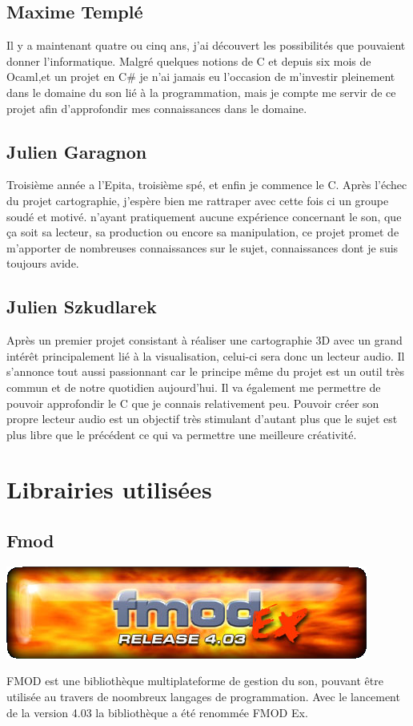 \documentclass[12pt,a4paper]{report}
\begin{document}
	\subsection{Maxime Templé}
Il y a maintenant quatre ou cinq ans, j'ai découvert les possibilités que pouvaient donner l'informatique. Malgré quelques notions de C et depuis six mois de Ocaml,et un projet en C\# je n'ai jamais eu l'occasion de m'investir pleinement dans le domaine du son lié à la programmation, mais je compte me servir de ce projet afin d'approfondir mes connaissances dans le domaine.

	\subsection{Julien Garagnon}
Troisième année a l'Epita, troisième spé, et enfin je commence le C. Après l'échec du projet cartographie, j'espère bien me rattraper avec cette fois ci un groupe soudé et motivé. n'ayant pratiquement aucune expérience concernant le son, que ça soit sa lecteur, sa production ou encore sa manipulation, ce projet promet de m'apporter de nombreuses connaissances sur le sujet, connaissances dont je suis toujours avide.

	\subsection{Julien Szkudlarek}
Après un premier projet consistant à réaliser une cartographie 3D avec un grand intérêt principalement lié à la visualisation, celui-ci sera donc un lecteur audio. Il s'annonce tout aussi passionnant car le principe même du projet est un outil très commun et de notre quotidien aujourd'hui. Il va également me permettre de pouvoir approfondir le C que je connais relativement peu. Pouvoir créer son propre lecteur audio est un objectif très stimulant d'autant plus que le sujet est plus libre que le précédent ce qui va permettre une meilleure créativité.

\section{Librairies utilisées}
	\subsection{Fmod}

\begin{center}
\includegraphics[scale =0.5]{fmodex.png}
\end{center}
FMOD est une bibliothèque multiplateforme de gestion du son, pouvant être utilisée au travers de noombreux langages de programmation. Avec le lancement de la version 4.03 la bibliothèque a été renommée FMOD Ex.
\end{document}
